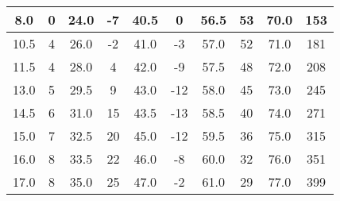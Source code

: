 \begin{table*}
\begin{ruledtabular}
\begin{tabular}{|cccccccccc|}
        \multicolumn{1}{|c|}{8.0}       & \multicolumn{1}{c|}{0}          & \multicolumn{1}{c|}{24.0}      & \multicolumn{1}{c|}{-7}         & \multicolumn{1}{c|}{40.5}      & \multicolumn{1}{c|}{0}          & \multicolumn{1}{c|}{56.5}      & \multicolumn{1}{c|}{53}         & \multicolumn{1}{c|}{70.0}      & 153        \\ \hline
        \multicolumn{1}{|c|}{10.5}      & \multicolumn{1}{c|}{4}          & \multicolumn{1}{c|}{26.0}      & \multicolumn{1}{c|}{-2}         & \multicolumn{1}{c|}{41.0}      & \multicolumn{1}{c|}{-3}         & \multicolumn{1}{c|}{57.0}      & \multicolumn{1}{c|}{52}         & \multicolumn{1}{c|}{71.0}      & 181        \\ \hline
        \multicolumn{1}{|c|}{11.5}      & \multicolumn{1}{c|}{4}          & \multicolumn{1}{c|}{28.0}      & \multicolumn{1}{c|}{4}          & \multicolumn{1}{c|}{42.0}      & \multicolumn{1}{c|}{-9}         & \multicolumn{1}{c|}{57.5}      & \multicolumn{1}{c|}{48}         & \multicolumn{1}{c|}{72.0}      & 208        \\ \hline
        \multicolumn{1}{|c|}{13.0}      & \multicolumn{1}{c|}{5}          & \multicolumn{1}{c|}{29.5}      & \multicolumn{1}{c|}{9}          & \multicolumn{1}{c|}{43.0}      & \multicolumn{1}{c|}{-12}        & \multicolumn{1}{c|}{58.0}      & \multicolumn{1}{c|}{45}         & \multicolumn{1}{c|}{73.0}      & 245        \\ \hline
        \multicolumn{1}{|c|}{14.5}      & \multicolumn{1}{c|}{6}          & \multicolumn{1}{c|}{31.0}      & \multicolumn{1}{c|}{15}         & \multicolumn{1}{c|}{43.5}      & \multicolumn{1}{c|}{-13}        & \multicolumn{1}{c|}{58.5}      & \multicolumn{1}{c|}{40}         & \multicolumn{1}{c|}{74.0}      & 271        \\ \hline
        \multicolumn{1}{|c|}{15.0}      & \multicolumn{1}{c|}{7}          & \multicolumn{1}{c|}{32.5}      & \multicolumn{1}{c|}{20}         & \multicolumn{1}{c|}{45.0}      & \multicolumn{1}{c|}{-12}        & \multicolumn{1}{c|}{59.5}      & \multicolumn{1}{c|}{36}         & \multicolumn{1}{c|}{75.0}      & 315        \\ \hline
        \multicolumn{1}{|c|}{16.0}      & \multicolumn{1}{c|}{8}          & \multicolumn{1}{c|}{33.5}      & \multicolumn{1}{c|}{22}         & \multicolumn{1}{c|}{46.0}      & \multicolumn{1}{c|}{-8}         & \multicolumn{1}{c|}{60.0}      & \multicolumn{1}{c|}{32}         & \multicolumn{1}{c|}{76.0}      & 351        \\ \hline
        \multicolumn{1}{|c|}{17.0}      & \multicolumn{1}{c|}{8}          & \multicolumn{1}{c|}{35.0}      & \multicolumn{1}{c|}{25}         & \multicolumn{1}{c|}{47.0}      & \multicolumn{1}{c|}{-2}         & \multicolumn{1}{c|}{61.0}      & \multicolumn{1}{c|}{29}         & \multicolumn{1}{c|}{77.0}      & 399        \\ \hline

\end{tabular}
\end{ruledtabular}
\end{table*}
